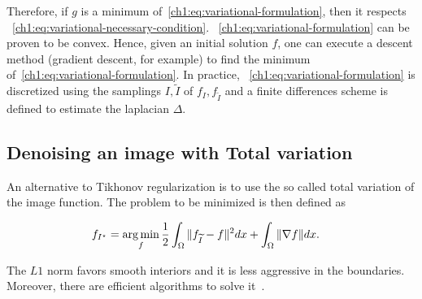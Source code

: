 Therefore, if $g$ is a minimum of~\cref{ch1:eq:variational-formulation}, then it respects ~\cref{ch1:eq:variational-necessary-condition}. ~\cref{ch1:eq:variational-formulation} can be proven to be convex. Hence, given an initial solution $f$, one can execute a descent method (gradient descent, for example) to find the minimum of~\cref{ch1:eq:variational-formulation}. In practice, ~\cref{ch1:eq:variational-formulation} is discretized using the samplings $I,\widetilde{I}$ of $f_I,f_{\widetilde{I}}$ and a finite differences scheme is defined to estimate the laplacian $\Delta$.

\subsection{Denoising an image with Total variation}
An alternative to Tikhonov regularization is to use the so called total variation of the image function. The problem to be minimized is then defined as

\begin{align}
	f_{I^{\star}} &= \operatorname*{arg\,min}_{f} \frac{1}{2} \int_{\Omega}{ \lVert f_{\widetilde{I}} - f\rVert^2dx} + \int_{\Omega}{ \lVert\nabla f\rVert dx}.
\end{align}

The $L1$ norm favors smooth interiors and it is less aggressive in the boundaries. Moreover, there are efficient algorithms to solve it~\cite{rudin92,chambolle04,beck09}.

